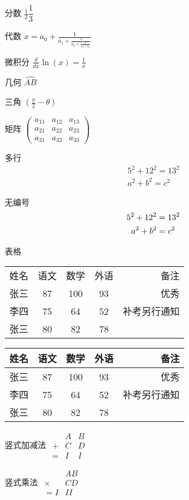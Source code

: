 \documentclass[a4paper,11pt]{article}
\begin{document}
\begin{CJK}{UTF8}{gkai}
分数
$ \frac{1}2{} \dfrac{1}{3}$

代数
$ x = a_0 + \frac{1}{a_1 + \frac{1}{a_2 + \frac{1}{a_3 + a_4}}} $

微积分 $\frac{d}{dx}\ln(x)=\frac{1}{x}$

几何
$ \widehat{AB} $

三角
$\left(\frac{\pi}{2}-\theta \right )$

矩阵
$\begin{pmatrix}
 a_{11} & a_{12} & a_{13}\\ 
 a_{21} & a_{22} & a_{23}\\ 
 a_{31} & a_{32} & a_{33}
 \end{pmatrix}$
 
 多行  \begin{gather}
 5^2+12^2=13^2\\
 a^2 + b^2 = c^2
 \end{gather}
 
 无编号 \begin{gather}
 5^2+12^2=13^2 \notag\\
 a^2 + b^2 = c^2\notag
\end{gather}
 
表格
\begin{tabular}{l c c  c r}
姓名 & 语文 & 数学 & 外语 & 备注 \\
张三 & 87 & 100 & 93 & 优秀  \\
李四 & 75 & 64 & 52 & 补考另行通知  \\
张三 & 80 & 82 & 78 &   \\
\end{tabular}

\begin{tabular}{|l| c| c|  c| r|}
\hline
姓名 & 语文 & 数学 & 外语 & 备注 \\
\hline
张三 & 87 & 100 & 93 & 优秀  \\
\hline
李四 & 75 & 64 & 52 & 补考另行通知  \\
\hline
张三 & 80 & 82 & 78 &   \\
\hline
\end{tabular}

竖式加减法
$\begin{array}{ccc} 
&A&B\\ 
+&C&D\\ 
\hline 
=&I&I 
\end{array}$

竖式乘法
$\begin{array}{ccc} 
&AB\\ 
\times &CD\\ 
\hline 
=I&II 
\end{array}$


\end{CJK}
\end{document}

